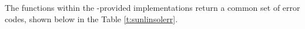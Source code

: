 


The functions within the {\sundials}-provided 
implementations return a common set of error codes, shown below in the
Table \ref{t:sunlinsolerr}. 

\newlength{\ColumnOne}
\newlength{\ColumnTwo}
\newlength{\ColumnThree}
\setlength{\ColumnThree}{\textwidth}
\addtolength{\ColumnThree}{-0.5in}
\addtolength{\ColumnThree}{-\ColumnOne}
\addtolength{\ColumnThree}{-\ColumnTwo}

